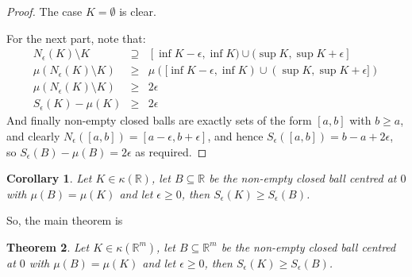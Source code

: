 \documentclass[a4paper,11pt]{article}
\newcommand{\bbR}{\mathbb{R}}
\newtheorem{thm}{Theorem}[section]
\newtheorem{corollary}[thm]{Corollary}
\begin{document}
\begin{proof}
The case $K=\emptyset$ is clear.

For the next part, note that:
%
\begin{eqnarray*}
N_\epsilon(K)\setminus K &\supseteq&
	[\inf K-\epsilon,\inf K)\cup(\sup K,\sup K+\epsilon] \\
\mu(N_\epsilon(K)\setminus K)&\geq&
	\mu([\inf K-\epsilon,\inf K)\cup(\sup K,\sup K+\epsilon]) \\
\mu(N_\epsilon(K)\setminus K)&\geq& 2\epsilon \\
S_\epsilon(K)-\mu(K)&\geq& 2\epsilon
\end{eqnarray*}
%
And finally non-empty closed balls are exactly sets of the form $[a,b]$ with
$b\geq a$, and
clearly $N_\epsilon([a,b])=[a-\epsilon,b+\epsilon]$, and hence
$S_\epsilon([a,b])=b-a+2\epsilon$, so $S_\epsilon(B)-\mu(B)=2\epsilon$ as
required.
\end{proof}

\begin{corollary}
\label{thm:mainTheoremForR}
Let $K\in\kappa(\bbR)$, let $B\subseteq \bbR$ be the non-empty closed
ball centred at $0$ with $\mu(B)=\mu(K)$ and let $\epsilon\geq0$, then
$S_\epsilon(K)\geq S_\epsilon(B)$.
\end{corollary}

So, the main theorem is

\begin{thm}
Let $K\in\kappa(\bbR^m)$, let $B\subseteq \bbR^m$ be the non-empty closed
ball centred at $0$ with $\mu(B)=\mu(K)$ and let $\epsilon\geq0$, then
$S_\epsilon(K)\geq S_\epsilon(B)$.
\end{thm}
\end{document}
